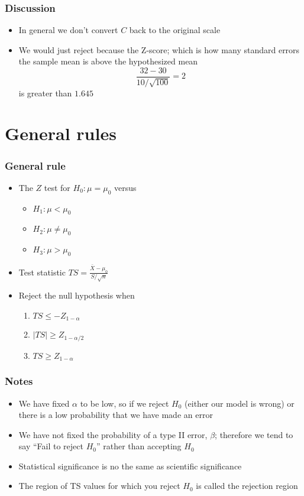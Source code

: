 \documentclass{beamer}
\begin{document}
\begin{frame}\frametitle{Discussion}
\begin{itemize}
\item In general we don't convert $C$ back to the original scale
\item We would just reject because the Z-score; which is how many
  standard errors the sample mean is above the hypothesized mean
  $$
  \frac{32 - 30}{10 / \sqrt{100}} = 2
  $$
  is greater than $1.645$
\end{itemize}

\section{General rules}
\end{frame}
\begin{frame}\frametitle{General rule}
\begin{itemize}
\item The $Z$ test for $H_0:\mu = \mu_0$ versus 
  \begin{itemize}
  \item $H_1: \mu < \mu_0$
  \item $H_2: \mu \neq \mu_0$
  \item $H_3: \mu > \mu_0$ 
  \end{itemize}
 \item Test statistic $ TS = \frac{\bar{X} - \mu_0}{S / \sqrt{n}} $
 \item Reject the null hypothesis when 
  \begin{enumerate}[$H_1:$]
  \item $TS \leq -Z_{1 - \alpha}$
  \item $|TS| \geq Z_{1 - \alpha / 2}$
  \item $TS \geq Z_{1 - \alpha}$
  \end{enumerate}
\end{itemize}

\end{frame}
\begin{frame}\frametitle{Notes}
\begin{itemize}
\item We have fixed $\alpha$ to be low, so if we reject $H_0$ (either
  our model is wrong) or there is a low probability that we have made
  an error
\item We have not fixed the probability of a type II error, $\beta$;
  therefore we tend to say ``Fail to reject $H_0$'' rather than
  accepting $H_0$
\item Statistical significance is no the same as scientific
  significance
\item The region of TS values for which you reject $H_0$ is called the
  rejection region
\end{itemize}
\end{frame}
\end{document}
